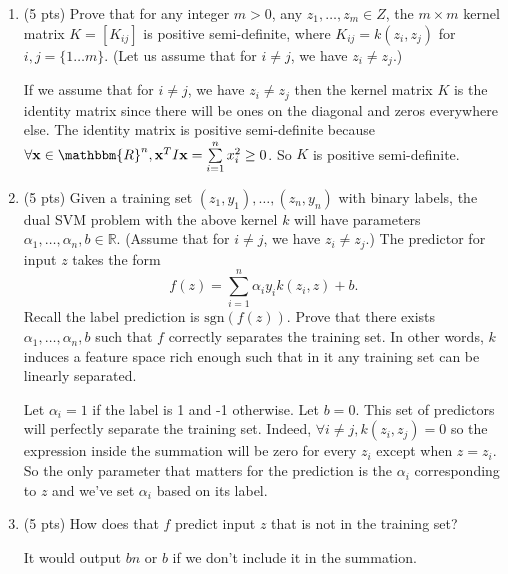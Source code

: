 \documentclass[a4paper]{article}
\theoremstyle{definition}
\newcommand{\sgn}{\mathrm{sgn}}
\def\R{\mathbb R}
\newenvironment{soln}{
    \leavevmode\color{blue}\ignorespaces
}{}
\begin{document}
\begin{enumerate}
\item (5 pts) Prove that for any integer $m>0$, any $z_1, \ldots, z_m \in Z$, the $m \times m$ kernel matrix $K=[K_{ij}]$ is positive semi-definite, where $K_{ij}=k(z_i, z_j)$ for $i,j=\{1\ldots m\}$. (Let us assume that for $i \neq j$, we have $z_i \neq z_j$.)

\begin{soln}
    If we assume that for $i \neq j$, we have $z_i \neq z_j$ then the kernel matrix $K$ is the identity matrix since there will be ones on the diagonal and zeros everywhere else.
    The identity matrix is positive semi-definite because $\forall \mathbf{x} \in \mathbbm{R}^n, \mathbf{x}^{T}I\mathbf{x} = \sum\limits_{i=1}^{n} x_i^2 \geq 0$.
    So $K$ is positive semi-definite.
\end{soln}

\item (5 pts) Given a training set $(z_1, y_1), \ldots, (z_n, y_n)$ with binary labels, the dual SVM problem with the above kernel $k$ will have parameters $\alpha_1, \ldots, \alpha_n, b \in \R$.  (Assume that for $i \neq j$, we have $z_i \neq z_j$.) The predictor for input $z$ takes the form
$$f(z) = \sum_{i=1}^n \alpha_i y_i k(z_i, z) + b.$$
Recall the label prediction is $\sgn(f(z))$.
Prove that there exists $\alpha_1, \ldots, \alpha_n, b$ such that $f$ correctly separates the training set.
In other words, $k$ induces a feature space rich enough such that in it any training set can be linearly separated.

\begin{soln}
    Let $\alpha_i = 1$ if the label is 1 and -1 otherwise. Let $b=0$.
    This set of predictors will perfectly separate the training set.
    Indeed, $\forall i \neq j, k(z_i, z_j) = 0$ so the expression inside the summation will be zero for every $z_i$ except when $z = z_i$.
    So the only parameter that matters for the prediction is the $\alpha_i$ corresponding to $z$ and we've set $\alpha_i$ based on its label.
\end{soln}

\item (5 pts) How does that $f$ predict input $z$ that is not in the training set?

\begin{soln}
    It would output $bn$ or $b$ if we don't include it in the summation.
\end{soln}

\end{enumerate}
\end{document}
